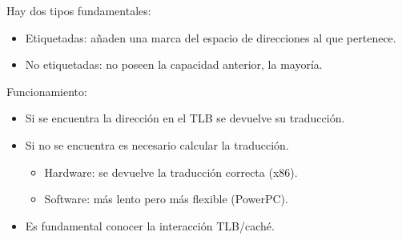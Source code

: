 \documentclass{article}
\begin{document}
Hay dos tipos fundamentales:
\begin{itemize}
\item Etiquetadas: añaden una marca del espacio de direcciones al que pertenece.

\item No etiquetadas: no poseen la capacidad anterior, la mayoría.
\end{itemize}

Funcionamiento:
\begin{itemize}
\item Si se encuentra la dirección en el TLB se devuelve su traducción.

\item Si no se encuentra es necesario calcular la traducción.
	\begin{itemize}
	\item Hardware: se devuelve la traducción correcta (x86).
	
	\item Software: más lento pero más flexible (PowerPC).
	\end{itemize}

\item Es fundamental conocer la interacción TLB/caché.

\end{itemize}
\end{document}

